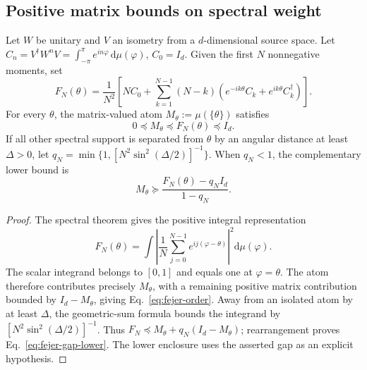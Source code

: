 \subsection{Positive matrix bounds on spectral weight}
\label{sec:fejer-certificate}
\begin{proposition}\label{prop:fejer}
Let $W$ be unitary and $V$ an isometry from a $d$-dimensional source space. Let $C_n=V^\dagger W^nV=\int_{-\pi}^{\pi}e^{in\varphi}\,\mathrm d\mu(\varphi)$, $C_0=I_d$. Given the first $N$ nonnegative moments, set
\begin{equation}
F_N(\theta)=\frac1{N^2}\left[N C_0+\sum_{k=1}^{N-1}(N-k)\left(e^{-ik\theta}C_k+e^{ik\theta}C_k^\dagger\right)\right].\label{eq:fejer-matrix}
\end{equation}
For every $\theta$, the matrix-valued atom $M_\theta:=\mu(\{\theta\})$ satisfies
\begin{equation}\label{eq:fejer-order}
\boxed{0\preceq M_\theta\preceq F_N(\theta)\preceq I_d.}
\end{equation}
If all other spectral support is separated from $\theta$ by an angular distance at least $\Delta>0$, let $q_N=\min\{1,[N^2\sin^2(\Delta/2)]^{-1}\}$. When $q_N<1$, the complementary lower bound is
\begin{equation}
M_\theta\succeq\frac{F_N(\theta)-q_NI_d}{1-q_N}.
\label{eq:fejer-gap-lower}
\end{equation}
\end{proposition}
\begin{proof}
The spectral theorem gives the positive integral representation
\begin{equation}
F_N(\theta)=\int\left|\frac1N\sum_{j=0}^{N-1}e^{ij(\varphi-\theta)}\right|^2\mathrm d\mu(\varphi).
\end{equation}
The scalar integrand belongs to $[0,1]$ and equals one at $\varphi=\theta$. The atom therefore contributes precisely $M_\theta$, with a remaining positive matrix contribution bounded by $I_d-M_\theta$, giving Eq.~\eqref{eq:fejer-order}. Away from an isolated atom by at least $\Delta$, the geometric-sum formula bounds the integrand by $[N^2\sin^2(\Delta/2)]^{-1}$. Thus $F_N\preceq M_\theta+q_N(I_d-M_\theta)$; rearrangement proves Eq.~\eqref{eq:fejer-gap-lower}. The lower enclosure uses the asserted gap as an explicit hypothesis.
\end{proof}

